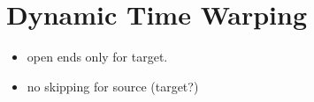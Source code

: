 

\section{Dynamic Time Warping} %
\label{sec:dynamic_time_warping}
\newcommand{\ttt}{\mathcal T}
\newcommand{\auto}{\boldsymbol \gamma}
\newcommand{\Auto}{\boldsymbol \Gamma}

\begin{itemize}
	\item open ends only for target.
	\item no skipping for source (target?)
\end{itemize}

